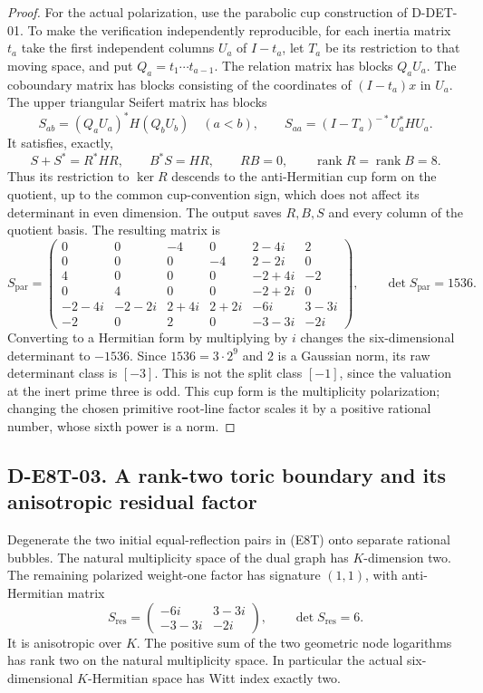 \begin{proof}
For the actual polarization, use the parabolic cup construction of
D-DET-01. To make the verification independently reproducible, for
each inertia matrix $t_a$ take the first independent columns $U_a$
of $I-t_a$, let $T_a$ be its restriction to that moving space, and put
$Q_a=t_1\cdots t_{a-1}$. The relation matrix has blocks $Q_aU_a$.
The coboundary matrix has blocks consisting of the coordinates of
$(I-t_a)x$ in $U_a$. The upper triangular Seifert matrix has blocks
\[
S_{ab}=(Q_aU_a)^*H(Q_bU_b)\quad(a<b),\qquad
S_{aa}=(I-T_a)^{-*}U_a^*HU_a.
\]
It satisfies, exactly,
\[
S+S^*=R^*HR,\qquad B^*S=HR,\qquad RB=0,
\qquad \operatorname{rank}R=\operatorname{rank}B=8.
\]
Thus its restriction to $\ker R$ descends to the anti-Hermitian cup
form on the quotient, up to the common cup-convention sign, which
does not affect its determinant in even dimension. The output saves
$R,B,S$ and every column of the quotient basis. The resulting matrix is
\[
S_{\mathrm{par}}=\begin{pmatrix}
0&0&-4&0&2-4i&2\\
0&0&0&-4&2-2i&0\\
4&0&0&0&-2+4i&-2\\
0&4&0&0&-2+2i&0\\
-2-4i&-2-2i&2+4i&2+2i&-6i&3-3i\\
-2&0&2&0&-3-3i&-2i
\end{pmatrix},
\qquad \det S_{\mathrm{par}}=1536.
\]
Converting to a Hermitian form by multiplying by $i$ changes the
six-dimensional determinant to $-1536$. Since $1536=3\cdot2^9$
and $2$ is a Gaussian norm, its raw determinant class is $[-3]$.
This is not the split class $[-1]$, since the valuation at the
inert prime three is odd. This cup form is the multiplicity
polarization; changing the chosen primitive root-line factor scales
it by a positive rational number, whose sixth power is a norm.
\end{proof}

\subsection*{D-E8T-03. A rank-two toric boundary and its anisotropic residual factor}
Degenerate the two initial equal-reflection pairs in (E8T) onto
separate rational bubbles. The natural multiplicity space of the
dual graph has $K$-dimension two. The remaining polarized
weight-one factor has signature $(1,1)$, with anti-Hermitian matrix
\[
S_{\mathrm{res}}=
\begin{pmatrix}-6i&3-3i\\-3-3i&-2i\end{pmatrix},
\qquad \det S_{\mathrm{res}}=6.
\]
It is anisotropic over $K$. The positive sum of the two geometric
node logarithms has rank two on the natural multiplicity space.
In particular the actual six-dimensional $K$-Hermitian space has
Witt index exactly two.

